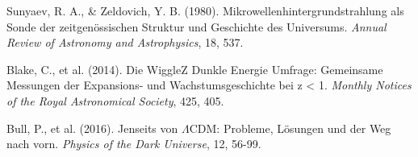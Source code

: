\documentclass[a4paper,12pt]{article}
\theoremstyle{definition}
\theoremstyle{remark}
\begin{document}
\begin{thebibliography}{99}
		 Sunyaev, R. A., \& Zeldovich, Y. B. (1980). Mikrowellenhintergrundstrahlung als Sonde der zeitgenössischen Struktur und Geschichte des Universums. \textit{Annual Review of Astronomy and Astrophysics}, 18, 537.
		
		 Blake, C., et al. (2014). Die WiggleZ Dunkle Energie Umfrage: Gemeinsame Messungen der Expansions- und Wachstumsgeschichte bei z < 1. \textit{Monthly Notices of the Royal Astronomical Society}, 425, 405.
		
		 Bull, P., et al. (2016). Jenseits von $\Lambda$CDM: Probleme, Lösungen und der Weg nach vorn. \textit{Physics of the Dark Universe}, 12, 56-99.
	\end{thebibliography}
	
\end{document}
